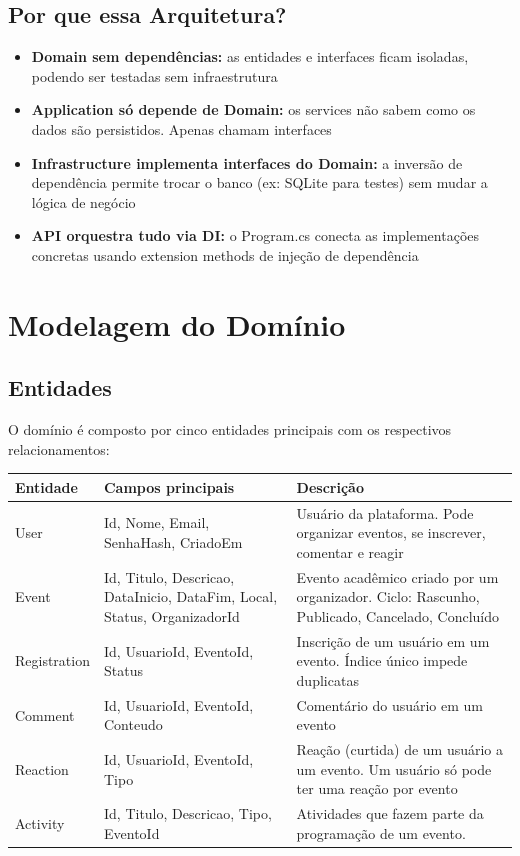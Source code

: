 \documentclass[11pt, a4paper, oneside]{article}
\begin{document}
\subsection{Por que essa Arquitetura?}

\begin{itemize}
  \item \textbf{Domain sem dependências:} as entidades e interfaces ficam isoladas, podendo ser testadas sem infraestrutura
  \item \textbf{Application só depende de Domain:} os services não sabem como os dados são persistidos. Apenas chamam interfaces
  \item \textbf{Infrastructure implementa interfaces do Domain:} a inversão de dependência permite trocar o banco (ex: SQLite para testes) sem mudar a lógica de negócio
  \item \textbf{API orquestra tudo via DI:} o Program.cs conecta as implementações concretas usando extension methods de injeção de dependência
\end{itemize}

\section{Modelagem do Domínio}

\subsection{Entidades}

O domínio é composto por cinco entidades principais com os respectivos relacionamentos:

\begin{longtable}{L{3cm} L{5cm} L{6.5cm}}
\toprule
{}
\color{white}\textbf{Entidade} & \color{white}\textbf{Campos principais} & \color{white}\textbf{Descrição} \\
\midrule
\endhead
User & Id, Nome, Email, SenhaHash, CriadoEm & Usuário da plataforma. Pode organizar eventos, se inscrever, comentar e reagir \\
Event & Id, Titulo, Descricao, DataInicio, DataFim, Local, Status, OrganizadorId & Evento acadêmico criado por um organizador. Ciclo: Rascunho, Publicado, Cancelado, Concluído \\
Registration & Id, UsuarioId, EventoId, Status & Inscrição de um usuário em um evento. Índice único impede duplicatas \\
Comment & Id, UsuarioId, EventoId, Conteudo & Comentário do usuário em um evento \\
Reaction & Id, UsuarioId, EventoId, Tipo & Reação (curtida) de um usuário a um evento. Um usuário só pode ter uma reação por evento \\
Activity & Id, Titulo, Descricao, Tipo, EventoId & Atividades que fazem parte da programação de um evento. \\
\bottomrule
\end{longtable}
\end{document}
